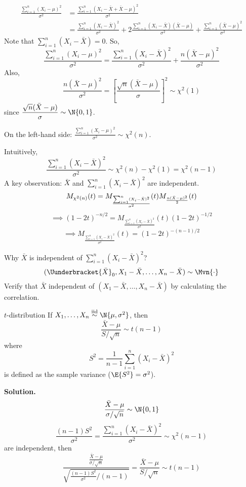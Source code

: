 \begin{Proof}{}{}
    \begin{align*}
        \frac{\sum_{i=1}^{n} (X_i-\mu)^2}{\sigma^2}
         & =\frac{\sum_{i=1}^{n} (X_i-\bar{X}+\bar{X}-\mu)^2}{\sigma^2} \\
         & =\frac{\sum_{i=1}^{n} (X_i-\bar{X})^2}{\sigma^2}+2
        \frac{\sum_{i=1}^{n} (X_i-\bar{X})(\bar{X}-\mu)}{\sigma^2}+
        \frac{\sum_{i=1}^{n} (\bar{X}-\mu)^2}{\sigma^2}
    \end{align*}
    Note that $ \sum_{i=1}^{n} (X_i-\bar{X})=0 $. So,
    \[ \frac{\sum_{i=1}^{n} (X_i-\mu)^2}{\sigma^2}=
        \frac{\sum_{i=1}^{n} (X_i-\bar{X})^2}{\sigma^2}+
        \frac{n(\bar{X}-\mu)^2}{\sigma^2} \]
    Also,
    \[ \frac{n(\bar{X}-\mu)^2}{\sigma^2}=
        \left[ \frac{\sqrt{n}(\bar{X}-\mu)}{\sigma} \right]^2 \sim \chi^2(1)  \]
    since $ \displaystyle \frac{\sqrt{n}(\bar{X}-\mu)}{\sigma} \sim \N{0,1} $.

    On the left-hand side: $ \displaystyle  \frac{\sum_{i=1}^{n} (X_i-\mu)^2}{\sigma^2}\sim \chi^2(n) $.

    Intuitively,
    \[ \frac{\sum_{i=1}^{n}(X_i-\bar{X})^2}{\sigma^2}\sim \chi^2(n)-\chi^2(1)=\chi^2(n-1)  \]
    A key observation: $ \bar{X} $ and $ \sum_{i=1}^{n} (X_i-\bar{X})^2 $
    are independent.
    \[
        M_{\chi^2(n)}(t)=M_{\frac{\sum_{i=1}^{n} (X_i-\bar{X})^2}{\sigma^2}}(t)
        M_{\frac{n(\bar{X}-\mu)^2}{2}}(t)\\
    \]
    \[ \implies (1-2t)^{-n/2}=M_{\frac{\sum_{i=1}^{n} (X_i-\bar{X})^2}{\sigma^2}}(t)
        (1-2t)^{-1/2} \]
    \[ \implies M_{\frac{\sum_{i=1}^{n} (X_i-\bar{X})^2}{\sigma^2}}(t)=(1-2t)^{-(n-1)/2}  \]
\end{Proof}
Why $ \bar{X} $ is independent of $ \sum_{i=1}^{n} (X_i-\bar{X})^2 $?
\[ (\Uunderbracket{\bar{X}}_{0},X_1-\bar{X},\ldots,X_n-\bar{X})\sim \Mvn{\cdot} \]
Verify that $ \bar{X} $ independent of $ (X_1-\bar{X},\ldots,X_n-\bar{X}) $
by calculating the correlation.
\begin{Example}{$ t $-distribution}{}
    If $ X_1,\ldots,X_n \stackrel{\text{iid}}{\sim}\N{\mu,\sigma^2} $,
    then
    \[ \frac{\bar{X}-\mu}{S/\sqrt{n}}\sim t(n-1)  \]
    where
    \[ S^2=\frac{1}{n-1} \sum_{i=1}^{n} (X_i-\bar{X})^2 \]
    is defined as the sample variance ($ \E{S^2}=\sigma^2 $).

    \textbf{Solution.}
    \[ \frac{\bar{X}-\mu}{\sigma/\sqrt{n}}\sim \N{0,1}  \]
    \[ \frac{(n-1)S^2}{\sigma^2}=\frac{\sum_{i=1}^{n} (X_i-\bar{X})^2}{\sigma^2}
        \sim \chi^2(n-1)   \]
    are independent, then
    \[ \frac{\displaystyle \frac{\bar{X}-\mu}{\sigma/\sqrt{n}}}{
            \displaystyle \sqrt{\frac{(n-1)S^2}{\sigma^2}/(n-1)}
        } =\frac{\bar{X}-\mu}{S/\sqrt{n}} \sim t(n-1) \]
\end{Example}
